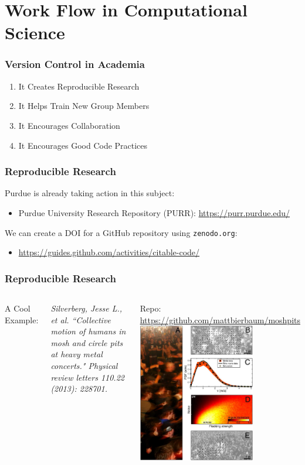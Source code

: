 
\section[Work Flow]{Work Flow in Computational Science}

\begin{frame}
\frametitle{\large{Version Control in Academia}}
\begin{enumerate}
\item It Creates Reproducible Research
\item It Helps Train New Group Members
\item It Encourages Collaboration
\item It Encourages Good Code Practices
\end{enumerate}
\end{frame}
\note{}

\begin{frame}
\frametitle{\large{Reproducible Research}}
Purdue is already taking action in this subject:
\begin{itemize}
\item  Purdue University Research Repository (PURR): \url{https://purr.purdue.edu/}
\end{itemize}
\vspace{3mm}
We can create a DOI for a GitHub repository using \texttt{zenodo.org}:
\begin{itemize}
\item \small \url{https://guides.github.com/activities/citable-code/}
\end{itemize}
\end{frame}
\note{}

\begin{frame}
\frametitle{\large{Reproducible Research}}
\begin{columns}[c]
\column{2in}
A Cool Example:

\vspace{3mm}
\emph{\small Silverberg, Jesse L., et al. ``Collective motion of humans in mosh and circle pits at heavy metal concerts." Physical review letters 110.22 (2013): 228701.}
\vspace{5mm}

Repo: \url{https://github.com/mattbierbaum/moshpits}
\column{2in}
\includegraphics[width=2in]{img/mosh_physics.png}
\end{columns}

\end{frame}
\note{}

